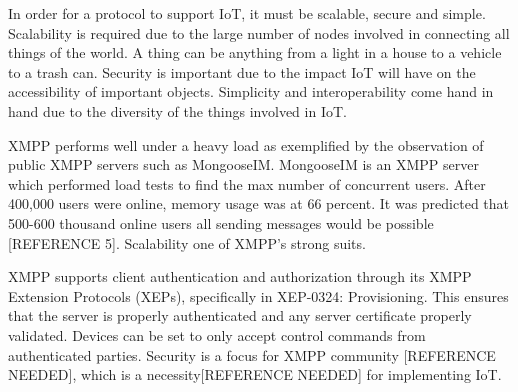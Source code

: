 In order for a protocol to support IoT, it must be scalable, secure and simple. Scalability is required due to the large number of nodes involved in connecting all things of the world. A thing can be anything from a light in a house to a vehicle to a trash can. Security is important due to the impact IoT will have on the accessibility of important objects. Simplicity and interoperability come hand in hand due to the diversity of the things involved in IoT.\n

XMPP performs well under a heavy load as exemplified by the observation of public XMPP servers such as MongooseIM. MongooseIM is an XMPP server which performed load tests to find the max number of concurrent users. After 400,000 users were online, memory usage was at 66 percent. It was predicted that 500-600 thousand online users all sending messages would be possible [REFERENCE 5]. Scalability one of XMPP’s strong suits.\n

XMPP supports client authentication and authorization through its XMPP Extension Protocols (XEPs), specifically in XEP-0324: Provisioning. This ensures that the server is properly authenticated and any server certificate properly validated. Devices can be set to only accept control commands from authenticated parties. Security is a focus for XMPP community [REFERENCE NEEDED], which is a necessity[REFERENCE NEEDED] for implementing IoT.\n
